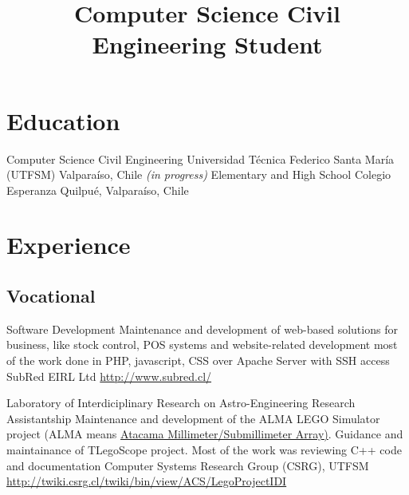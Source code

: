\documentclass[11pt,a4paper,sans]{moderncv}
\title{Computer Science Civil Engineering Student}
\begin{document}
\maketitle



	   
\section{Education}

        {Computer Science Civil Engineering}
        {Universidad Técnica Federico Santa María (UTFSM)}
        {Valparaíso, Chile}
        {\emph{(in progress)}}
        {}
        {Elementary and High School}
        {Colegio Esperanza}
        {Quilpué, Valparaíso, Chile}
        {}{}

\section{Experience}
\subsection{Vocational}
        
        {Software Development}
        {Maintenance and development of web-based solutions for business, like stock control, POS systems and website-related development}
        {most of the work done in PHP, javascript, CSS over Apache Server with SSH access}
        {SubRed EIRL Ltd}
        {\url{http://www.subred.cl/}}

        {Laboratory of Interdiciplinary Research on Astro-Engineering Research Assistantship}
        {Maintenance and development of the ALMA LEGO Simulator project (ALMA means \href{http://www.alma.cl/}{Atacama Millimeter/Submillimeter Array)}. Guidance and maintainance of TLegoScope project.}
        {Most of the work was reviewing C++ code and documentation}
        {Computer Systems Research Group (CSRG), UTFSM}
        {\url{http://twiki.csrg.cl/twiki/bin/view/ACS/LegoProjectIDI}}
\end{document}
